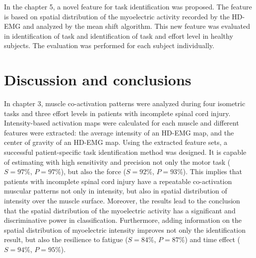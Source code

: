 In the chapter 5, a novel feature for task identification was proposed. The feature is based on spatial distribution of the myoelectric activity recorded by the HD-EMG and analyzed by the mean shift algorithm. This new feature was evaluated in identification of task and identification of task and effort level in healthy subjects. The evaluation was performed for each subject individually. 


\section{Discussion and conclusions}

In chapter 3, muscle co-activation patterns were analyzed during four isometric tasks and three effort levels in patients with incomplete spinal cord injury. Intensity-based activation maps were calculated for each muscle and different features were extracted: the average intensity of an HD-EMG map, and the center of gravity of an HD-EMG map. Using the extracted feature sets, a successful patient-specific task identification method was designed. It is capable of estimating with high sensitivity and precision not only the motor task ($S = 97\%$, $P = 97\%$), but also the force ($S = 92\%$, $P = 93\%$). This implies that patients with incomplete spinal cord injury have a repeatable co-activation muscular patterns not only in intensity, but also in spatial distribution of intensity over the muscle surface. Moreover, the results lead to the conclusion that the spatial distribution of the myoelectric activity has a significant and discriminative power in classification. Furthermore, adding information on the spatial distribution of myoelectric intensity improves not only the identification result, but also the resilience to fatigue ($S = 84\%$, $P = 87\%$) and time effect ($S = 94\%$, $P = 95\%$).

